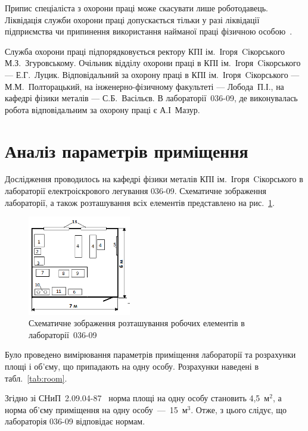 \documentclass[a4paper,fontsize=14bp,ukrainian]{extreport}
\begin{document}
Припис спеціаліста з охорони праці може скасувати лише роботодавець. Ліквідація служби охорони праці допускається тільки у разі ліквідації підприємства чи припинення використання найманої праці фізичною особою~\cite{tkachuk2006}.

Служба охорони праці підпорядковується ректору КПІ ім.~Ігоря~Cікорського М.З.~Згуровському. Очільник відділу охорони праці в КПІ ім.~Ігоря~Cікорського --- Е.Г.~Луцик. Відповідальний за охорону праці в КПІ ім.~Ігоря~Cікорського --- М.М.~Полторацький, на інженерно-фізичному факультеті --- Лобода~П.І., на кафедрі фізики металів --- С.Б.~Васільєв. В лабораторії~036-09, де виконувалась робота відповідальним за охорону праці є А.І~Мазур.

\section{Аналіз параметрів приміщення}

Дослідження проводилось на кафедрі фізики металів КПІ ім.~Ігоря~Cікорського в лабораторії електроіскрового легування 036-09. Схематичне зображення лабораторії, а також розташування всіх елементів представлено на рис.~\ref{fig:schema_room}.

\begin{figure}[H]
\centering
\includegraphics[width=0.4\textwidth]{schema_room.png}
\caption{Схематичне зображення розташування робочих елементів в лабораторії~036-09}
\label{fig:schema_room}
\end{figure}

Було проведено вимірювання параметрів приміщення лабораторії та розрахунки площі і об’єму, що припадають на одну особу. Розрахунки наведені  в табл.~\ref{tab:room}.


Згідно зі СНиП~2.09.04-87~\cite{snip} норма площі на одну особу становить 4,5~{м}${}^{2}$, а норма об'єму приміщення на одну особу~---~15~{м}${}^{3}$. Отже, з цього слідує, що лабораторія 036-09 відповідає нормам.

\end{document}
